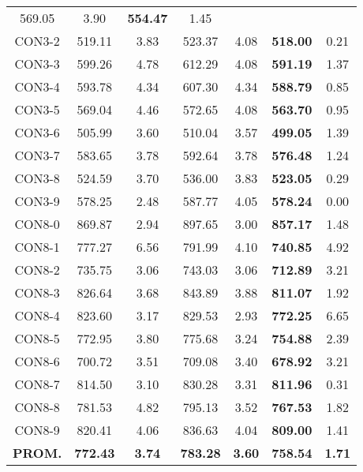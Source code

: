 \begin{table}[ht]
\begin{tabular}{c c c c c c c}
569.05 & 3.90 & \bf{554.47} & 
1.45\\CON3-2 & 519.11 & 3.83 & 
523.37 & 4.08 & \bf{518.00} & 
0.21\\CON3-3 & 599.26 & 4.78 & 
612.29 & 4.08 & \bf{591.19} & 
1.37\\CON3-4 & 593.78 & 4.34 & 
607.30 & 4.34 & \bf{588.79} & 
0.85\\CON3-5 & 569.04 & 4.46 & 
572.65 & 4.08 & \bf{563.70} & 
0.95\\CON3-6 & 505.99 & 3.60 & 
510.04 & 3.57 & \bf{499.05} & 
1.39\\CON3-7 & 583.65 & 3.78 & 
592.64 & 3.78 & \bf{576.48} & 
1.24\\CON3-8 & 524.59 & 3.70 & 
536.00 & 3.83 & \bf{523.05} & 
0.29\\CON3-9 & 578.25 & 2.48 & 
587.77 & 4.05 & \bf{578.24} & 
0.00\\CON8-0 & 869.87 & 2.94 & 
897.65 & 3.00 & \bf{857.17} & 
1.48\\CON8-1 & 777.27 & 6.56 & 
791.99 & 4.10 & \bf{740.85} & 
4.92\\CON8-2 & 735.75 & 3.06 & 
743.03 & 3.06 & \bf{712.89} & 
3.21\\CON8-3 & 826.64 & 3.68 & 
843.89 & 3.88 & \bf{811.07} & 
1.92\\CON8-4 & 823.60 & 3.17 & 
829.53 & 2.93 & \bf{772.25} & 
6.65\\CON8-5 & 772.95 & 3.80 & 
775.68 & 3.24 & \bf{754.88} & 
2.39\\CON8-6 & 700.72 & 3.51 & 
709.08 & 3.40 & \bf{678.92} & 
3.21\\CON8-7 & 814.50 & 3.10 & 
830.28 & 3.31 & \bf{811.96} & 
0.31\\CON8-8 & 781.53 & 4.82 & 
795.13 & 3.52 & \bf{767.53} & 
1.82\\CON8-9 & 820.41 & 4.06 & 
836.63 & 4.04 & \bf{809.00} & 
1.41\\\bf{PROM.} & 
\bf{772.43} & \bf{3.74} & \bf{783.28} & \bf{3.60} & \bf{758.54} & \bf{1.71}\\[1ex]\hline
\end{tabular}
\label{table:nonlin}
\end{table} \clearpage
